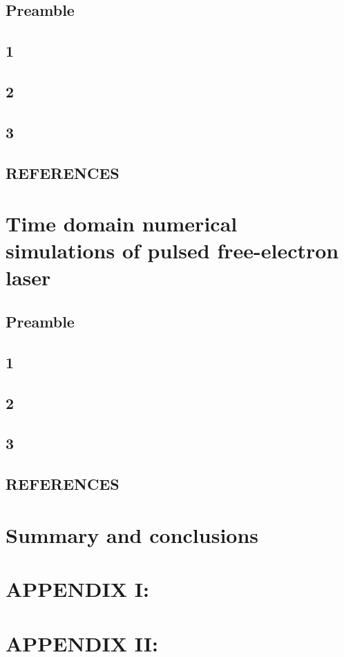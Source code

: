\documentclass[11pt, letterpaper]{article}
\begin{document}
	\subsection{Preamble}
	\subsection{1}
	\subsection{2}
	\subsection{3}
	\subsection{REFERENCES}

% 
%
\newpage
\section{Time domain numerical simulations of pulsed free-electron laser}
	\subsection{Preamble}
	\subsection{1}
	\subsection{2}
	\subsection{3}
	\subsection{REFERENCES}

% 
%
\newpage
\section{Summary and conclusions}

\newpage

\section{A\small{PPENDIX} I: }

\section{A\small{PPENDIX} II: }
\end{document}
